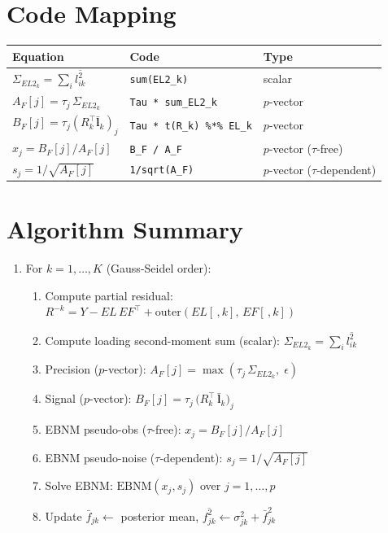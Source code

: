 \documentclass[11pt]{article}
\newcommand{\lsec}[2]{\overline{l^2_{#1#2}}}
\newcommand{\Rk}[0]{R^{-k}}
\begin{document}
\section{Code Mapping}\label{sec:code}

\begin{center}
\begin{tabular}{lll}
\toprule
Equation & Code & Type \\
\midrule
$\Sigma_{EL2_k} = \sum_i\lsec{i}{k}$ & \texttt{sum(EL2\_k)} & scalar \\
$A_F[j] = \tau_j\,\Sigma_{EL2_k}$ & \texttt{Tau * sum\_EL2\_k} & $p$-vector \\
$B_F[j] = \tau_j(R_k^\top\bar{\bm{l}}_k)_j$ & \texttt{Tau * t(R\_k) \%*\% EL\_k} & $p$-vector \\
$x_j = B_F[j]/A_F[j]$ & \texttt{B\_F / A\_F} & $p$-vector ($\tau$-free) \\
$s_j = 1/\sqrt{A_F[j]}$ & \texttt{1/sqrt(A\_F)} & $p$-vector ($\tau$-dependent) \\
\bottomrule
\end{tabular}
\end{center}

\section{Algorithm Summary}\label{sec:algorithm}

\begin{enumerate}
  \item For $k = 1, \ldots, K$ (Gauss-Seidel order):
  \begin{enumerate}
    \item Compute partial residual:
      $\Rk = Y - EL\,EF^\top + \mathrm{outer}(EL[\,,k],\,EF[\,,k])$
    \item Compute loading second-moment sum (scalar):
      $\Sigma_{EL2_k} = \sum_i\lsec{i}{k}$
    \item Precision ($p$-vector):
      $A_F[j] = \max(\tau_j\,\Sigma_{EL2_k},\;\epsilon)$
    \item Signal ($p$-vector):
      $B_F[j] = \tau_j\,\bigl(R_k^\top\,\bar{\bm{l}}_k\bigr)_j$
    \item EBNM pseudo-obs ($\tau$-free): $x_j = B_F[j]/A_F[j]$
    \item EBNM pseudo-noise ($\tau$-dependent): $s_j = 1/\sqrt{A_F[j]}$
    \item Solve EBNM:
      $\mathrm{EBNM}(x_j, s_j)$ over $j = 1,\ldots,p$
    \item Update $\bar{f}_{jk} \leftarrow$ posterior mean,\quad
      $\overline{f^2_{jk}} \leftarrow \sigma_{jk}^2 + \bar{f}_{jk}^2$
  \end{enumerate}
\end{enumerate}
\end{document}
